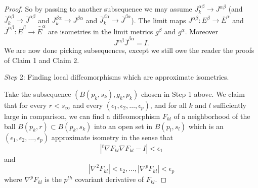 \begin{proof}

So by passing to another subsequence we may assume
$J_k^{\alpha\beta}\to J^{\alpha\beta}$ (and $\bar
J_k^{\alpha\beta}\to \bar J^{\alpha\beta}$ and
$J_k^{\beta\alpha}\to J^{\beta\alpha}$ and $\bar
J_k^{\beta\alpha}\to \bar J^{\beta\alpha}$). The limit maps
$J^{\alpha\beta}: E^{\beta}\to \bar E^{\alpha}$ and $\bar
J^{\alpha\beta}: \bar E^{\beta}\to {\bar{\bar E}}^{\alpha}$ are
isometries in the limit metrics $g^{\beta}$ and $g^{\alpha}$.
Moreover
$$
J^{\alpha\beta}\bar J^{\beta\alpha}=I.
$$
We are now done picking subsequences, except we still owe the
reader the proofs of Claim 1 and Claim 2.

\medskip
{\it Step} 2: Finding local diffeomorphisms which are approximate
isometries.

\smallskip
Take the subsequence $(B(p_k, s_k), g_k, p_k)$ chosen in Step 1
above. We claim that for every $r < s_{\infty}$ and every
$(\epsilon_1,\epsilon_2,\ldots,\epsilon_p)$, and for all $k$ and
$l$ sufficiently large in comparison, we can find a diffeomorphism
$F_{kl}$ of a neighborhood of the ball $B(p_k, r)\subset B(p_k,
s_k)$ into an open set in $B(p_l, s_l)$ which is an
$(\epsilon_1,\epsilon_2,\ldots,\epsilon_p)$ approximate isometry
in the sense that
$$
|^{t}\nabla F_{kl} \nabla F_{kl}-I|<\epsilon_1
$$
and
$$
|\nabla^2F_{kl}|<\epsilon_2,\ldots, |\nabla^pF_{kl}|<\epsilon_p
$$
where $\nabla^pF_{kl}$ is the $p^{th}$ covariant derivative of
$F_{kl}$.


\end{proof}
